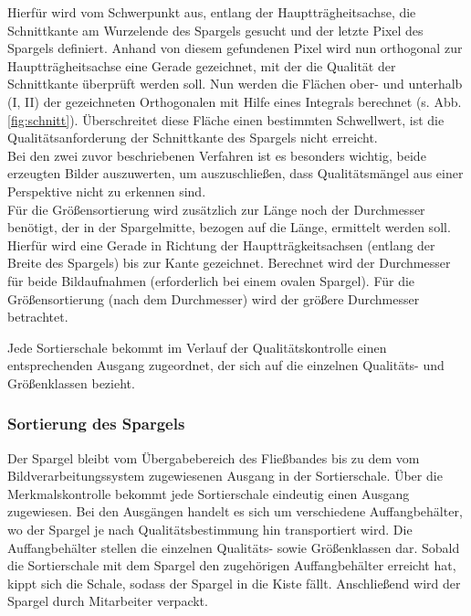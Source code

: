 \documentclass{ezb}
\begin{document}
Hierfür wird vom Schwerpunkt aus, entlang der Hauptträgheitsachse, die Schnittkante am Wurzelende des Spargels gesucht und der letzte Pixel des Spargels definiert.
Anhand von diesem gefundenen Pixel wird nun orthogonal zur Hauptträgheitsachse eine Gerade gezeichnet, mit der  die Qualität der Schnittkante überprüft werden soll.
Nun werden die Flächen ober- und unterhalb (I, II) der gezeichneten Orthogonalen mit Hilfe eines Integrals berechnet (s. Abb. \ref{fig:schnitt}).
Überschreitet diese Fläche einen bestimmten Schwellwert, ist die Qualitätsanforderung der Schnittkante des Spargels nicht erreicht.\\
\linebreak
Bei den zwei zuvor beschriebenen Verfahren ist es besonders wichtig, beide erzeugten Bilder auszuwerten, um auszuschließen, dass Qualitätsmängel aus einer Perspektive nicht zu erkennen sind.\\
\linebreak
Für die Größensortierung wird zusätzlich zur Länge noch der Durchmesser benötigt, der in der Spargelmitte, bezogen auf die Länge, ermittelt werden soll. Hierfür wird eine Gerade in Richtung der Hauptträgkeitsachsen (entlang der Breite des Spargels) bis zur Kante gezeichnet. Berechnet wird der Durchmesser für beide Bildaufnahmen (erforderlich bei einem ovalen Spargel). Für die Größensortierung (nach dem Durchmesser) wird der größere Durchmesser betrachtet.

Jede Sortierschale bekommt im Verlauf der Qualitätskontrolle einen entsprechenden Ausgang zugeordnet, der sich auf die einzelnen Qualitäts- und Größenklassen bezieht.

\subsubsection*{Sortierung des Spargels}
Der Spargel bleibt vom Übergabebereich des Fließbandes bis zu dem vom Bildverarbeitungssystem zugewiesenen Ausgang in der Sortierschale. Über die Merkmalskontrolle bekommt jede Sortierschale eindeutig einen Ausgang zugewiesen. Bei den Ausgängen handelt es sich um verschiedene Auffangbehälter, wo der Spargel je nach Qualitätsbestimmung
hin transportiert wird. Die Auffangbehälter stellen die einzelnen Qualitäts- sowie Größenklassen dar. 
Sobald die Sortierschale mit dem Spargel den zugehörigen Auffangbehälter erreicht
hat, kippt sich die Schale, sodass der Spargel in die Kiste fällt. 
Anschließend wird der Spargel durch Mitarbeiter verpackt.

\newpage
\end{document}
